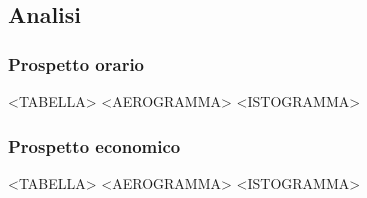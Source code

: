 \subsection{Analisi}

\subsubsection{Prospetto orario}

<TABELLA>
<AEROGRAMMA>
<ISTOGRAMMA>

\subsubsection{Prospetto economico}

<TABELLA>
<AEROGRAMMA>
<ISTOGRAMMA>


